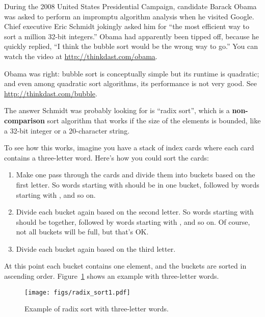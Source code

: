 \documentclass[12pt]{book}
\theoremstyle{exercise}
\begin{document}
During the 2008 United States Presidential Campaign, candidate Barack
Obama was asked to perform an impromptu algorithm analysis when he
visited Google. Chief executive Eric Schmidt jokingly asked him for
``the most efficient way to sort a million 32-bit integers.'' Obama
had apparently been tipped off, because he quickly replied, ``I think
the bubble sort would be the wrong way to go.'' You can watch the
video at \url{http://thinkdast.com/obama}.

Obama was right: bubble sort is conceptually simple but its runtime is
quadratic; and even among quadratic sort algorithms, its performance
is not very good.  See \url{http://thinkdast.com/bubble}.


The answer Schmidt was probably looking for is ``radix sort'', which is
a {\bf non-comparison} sort algorithm that works if the size of the
elements is bounded, like a 32-bit integer or a 20-character string.


To see how this works, imagine you have a stack of index cards where
each card contains a three-letter word. Here's how you could sort the
cards:

\begin{enumerate}

\item
  Make one pass through the cards and divide them into buckets based on
  the first letter. So words starting with  should be
  in one bucket, followed by words starting with , and so on.

\item
  Divide each bucket again based on the second letter. So words starting
  with  should be together, followed by words starting with
  , and so on. Of course, not all buckets will be full, but
  that's OK.

\item
  Divide each bucket again based on the third letter.

\end{enumerate}

At this point each bucket contains one element, and the buckets are
sorted in ascending order. Figure~\ref{fig-sort3}
shows an example with
three-letter words.

\begin{figure}
\centering
\texttt{[image: figs/radix\_sort1.pdf]}
\caption{Example of radix sort with three-letter words.}
\label{fig-sort3}
\end{figure}
\end{document}
